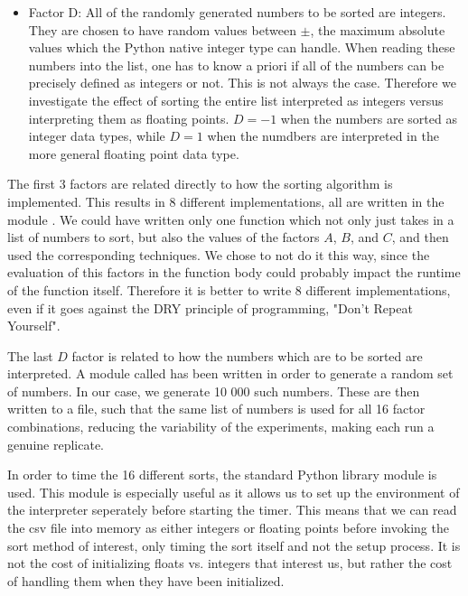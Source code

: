 \begin{itemize}
    \item Factor D: All of the randomly generated numbers to be sorted are integers. They are chosen to have random values between $\pm$, the maximum absolute values which the Python native integer type can handle. When reading these numbers into the list, one has to know a priori if all of the numbers can be precisely defined as integers or not. This is not always the case. Therefore we investigate the effect of sorting the entire list interpreted as integers versus interpreting them as floating points. $D=-1$ when the numbers are sorted as integer data types, while $D=1$ when the numdbers are interpreted in the more general floating point data type.
\end{itemize}

The first 3 factors are related directly to how the sorting algorithm is implemented. This results in 8 different implementations, all are written in the module . We could have written only one function which not only just takes in a list of numbers to sort, but also the values of the factors $A$, $B$, and $C$, and then used the corresponding techniques. We chose to not do it this way, since the evaluation of this factors in the function body could probably impact the runtime of the function itself. Therefore it is better to write 8 different implementations, even if it goes against the DRY principle of programming, "Don't Repeat Yourself".

The last $D$ factor is related to how the numbers which are to be sorted are interpreted. A module called  has been written in order to generate a random set of numbers. In our case, we generate 10 000 such numbers. These are then written to a  file, such that the same list of numbers is used for all 16 factor combinations, reducing the variability of the experiments, making each run a genuine replicate.

In order to time the 16 different sorts, the standard Python library module  is used. This module is especially useful as it allows us to set up the environment of the interpreter seperately before starting the timer. This means that we can read the csv file into memory as either integers or floating points before invoking the sort method of interest, only timing the sort itself and not the setup process. It is not the cost of initializing floats vs. integers that interest us, but rather the cost of handling them when they have been initialized.

